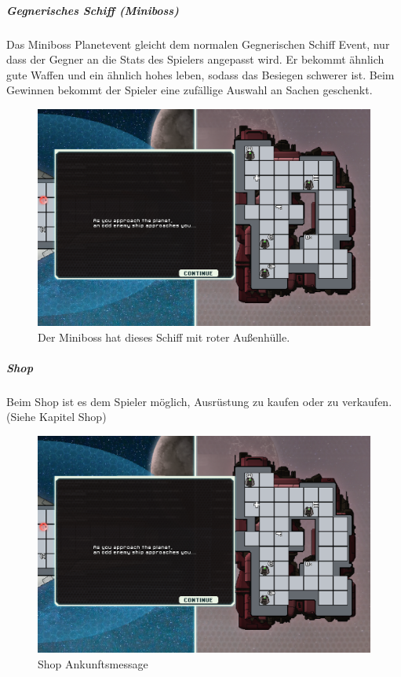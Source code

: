 \documentclass[fontsize=12pt,paper=a4,twoside]{scrartcl}
\begin{document}
\subparagraph{Gegnerisches Schiff (Miniboss)} Das Miniboss Planetevent gleicht dem normalen Gegnerischen Schiff Event, nur dass der Gegner an die Stats des Spielers angepasst wird. Er bekommt ähnlich gute Waffen und ein ähnlich hohes leben, sodass das Besiegen schwerer ist. Beim Gewinnen bekommt der Spieler eine zufällige Auswahl an Sachen geschenkt. 

\begin{figure}[H]
\centering
\includegraphics[width=1\linewidth]{DasSpiel/Karte/miniboss.png}
\caption{Der Miniboss hat dieses Schiff mit roter Außenhülle.}
\end{figure} 

\subparagraph{Shop} Beim Shop ist es dem Spieler möglich, Ausrüstung zu kaufen oder zu verkaufen. (Siehe Kapitel Shop)

\begin{figure}[H]
\centering
\includegraphics[width=1\linewidth]{DasSpiel/Karte/miniboss.png}
\caption{Shop Ankunftsmessage}
\end{figure}
\end{document}
